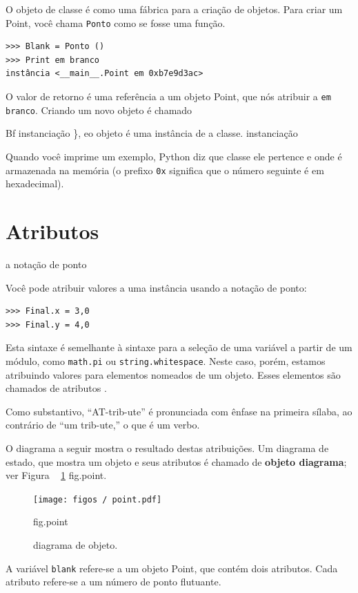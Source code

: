 \documentclass[10pt]{book}
\begin{document}
\begin{exercise}
\begin{v erbatim}
O objeto de classe é como uma fábrica para a criação de objetos. Para criar um
Point, você chama {\tt Ponto} como se fosse uma função.

\begin{verbatim}
>>> Blank = Ponto ()
>>> Print em branco
instância <__main__.Point em 0xb7e9d3ac>
\end{verbatim}
%
O valor de retorno é uma referência a um objeto Point, que nós
atribuir a {\tt em branco}.  
Criando um novo objeto é chamado
{Bf instanciação \}, eo objeto é uma instância {\bf} de
a classe.
\index{} instanciação

Quando você imprime um exemplo, Python diz que classe ele
pertence e onde é armazenada na memória (o prefixo
{\tt 0x} significa que o número seguinte é em hexadecimal).


\section{Atributos}
\label{atributos}
\index{} a notação de ponto

Você pode atribuir valores a uma instância usando a notação de ponto:

\begin{verbatim}
>>> Final.x = 3,0
>>> Final.y = 4,0
\end{verbatim}
%
Esta sintaxe é semelhante à sintaxe para a seleção de uma variável a partir de um
módulo, como {\tt math.pi} ou {\tt string.whitespace}. Neste caso,
porém, estamos atribuindo valores para elementos nomeados de um objeto.
Esses elementos são chamados de atributos {\bf}.

Como substantivo, ``AT-trib-ute'' é pronunciada com ênfase na primeira
sílaba, ao contrário de ``um trib-ute,'' o que é um verbo.

O diagrama a seguir mostra o resultado destas atribuições.
Um diagrama de estado, que mostra um objeto e seus atributos é
chamado de {\bf objeto diagrama}; ver Figura ~ \ref {} fig.point.

\begin{figure}
\centerline
{\texttt{[image: figos / point.pdf]}}
\caption{diagrama de objeto.}
\label{} fig.point
\end{figure}


A variável {\tt blank} refere-se a um objeto Point, que
contém dois atributos. Cada atributo refere-se a um
número de ponto flutuante.

}
\end{v erbatim}
\end{exercise}
\end{document}
